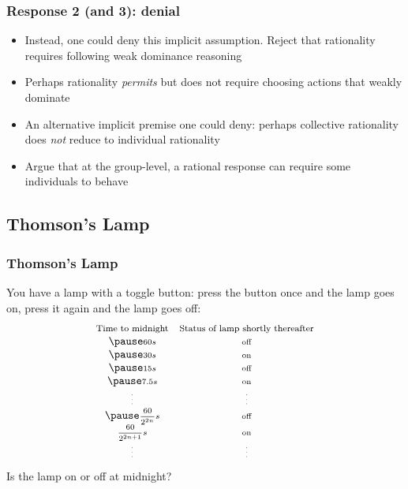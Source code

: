 \begin{frame}
\frametitle{Response 2 (and 3): denial}

\begin{itemize}[<+->]

\item Instead, one could deny this implicit assumption. Reject that rationality requires following weak dominance reasoning

\item Perhaps rationality \textit{permits} but does not require choosing actions that weakly dominate

\item An alternative implicit premise one could deny: perhaps collective rationality does \textit{not} reduce to individual rationality

\item Argue that at the group-level, a rational response can require some individuals to behave 

\end{itemize}
\end{frame}

\subsection{Thomson's Lamp}

\begin{frame}
\frametitle{Thomson's Lamp}

You have a lamp with a toggle button: press the button once and the lamp goes on, press it again and the lamp goes off:
\[
\begin{array}{cc}
\text{\footnotesize Time to midnight} & \text{\footnotesize Status of lamp shortly thereafter} \\
\pause \text{\scriptsize 60$s$} & \text{\scriptsize off} \\
\pause \text{\scriptsize 30$s$} & \text{\scriptsize on}\\ %
\pause \text{\scriptsize 15$s$} & \text{\scriptsize off}\\%
\pause \text{\scriptsize 7.5$s$} & \text{\scriptsize on}\\ %

\text{\tiny\vdots} & \text{\tiny\vdots}\\
\pause \text{\scriptsize $\dfrac{60}{2^{2n}}s$} & \text{\scriptsize off}\\ %
\text{\scriptsize $\dfrac{60}{2^{2n+1}}s$} & \text{\scriptsize on}\\%
\text{\tiny\vdots} & \text{\tiny\vdots}\\
\end{array}
\]
\pause 
Is the lamp on or off at midnight?

\end{frame}

